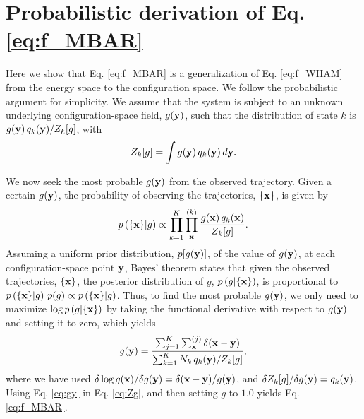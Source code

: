 \documentclass[reprint,aip,jcp,superscriptaddress]{revtex4-1}
\begin{document}
\appendix





\section{\label{sec:deriveMBAR}
Probabilistic derivation of Eq. \eqref{eq:f_MBAR}}



Here we show that
Eq. \eqref{eq:f_MBAR}
is a generalization of Eq. \eqref{eq:f_WHAM}
from the energy space to the configuration space.
%
We follow the probabilistic argument\cite{
bartels1997, *gallicchio2005, *habeck2007, *habeck2012, zhu2012}
for simplicity.
%
We assume that the system is subject to
an unknown underlying configuration-space field, $g(\mathbf{y})$,
such that the distribution of state $k$ is
$g(\mathbf{y}) \, q_k(\mathbf{y}) / Z_k[g]$, with
%
\begin{equation}
Z_k[g]
=
\int g(\mathbf{y}) \, q_k(\mathbf{y}) \, d\mathbf{y}.
\label{eq:Zg}
\end{equation}



We now seek the most probable $g(\mathbf{y})$
from the observed trajectory.
%
Given a certain $g(\mathbf{y})$,
the probability of observing the trajectories,
$\{ \mathbf{x} \}$,
is given by
%
\begin{equation*}
p\left( \{ \mathbf{x} \} | g \right)
\propto
\prod_{k = 1}^K
\prod_{\mathbf{x}}^{(k)}
\frac{ g(\mathbf{x}) \, q_k(\mathbf{x}) }
     { Z_k[g] }.
\end{equation*}
%
Assuming a uniform prior distribution,
$p[g(\mathbf{y})]$, of the value of $g(\mathbf{y})$,
at each configuration-space point $\mathbf{y}$,
Bayes' theorem\cite{leonard} states that
given the observed trajectories, $\{\mathbf{x}\}$,
the posterior distribution of $g$,
$p\left( g | \{ \mathbf{x} \} \right)$,
is proportional to
$p\left( \{ \mathbf{x} \} | g \right) \, p(g) \propto p\left( \{ \mathbf{x} \} | g \right)$.
%
Thus,
to find the most probable $g(\mathbf{y})$,
we only need to maximize
$\log p\left( g | \{ \mathbf{x} \} \right)$
by taking the functional derivative
with respect to $g(\mathbf{y})$
and setting it to zero,
which yields
%
\begin{equation}
g(\mathbf{y})
=
\frac{
  \sum_{j = 1}^K \sum_{\mathbf{x}}^{(j)} \delta(\mathbf{x} - \mathbf{y})
}
{
  \sum_{k = 1}^K N_k \, q_k(\mathbf{y}) / Z_k[g]
},
\label{eq:gy}
\end{equation}
%
where we have used
$\delta \log g(\mathbf{x}) / \delta g(\mathbf{y}) = \delta(\mathbf{x} - \mathbf{y})/g(\mathbf{y})$,
and
$\delta Z_k[g] / \delta g(\mathbf{y}) = q_k(\mathbf{y})$.
%
Using Eq. \eqref{eq:gy}
in Eq. \eqref{eq:Zg},
and then setting $g$ to $1.0$
yields Eq. \eqref{eq:f_MBAR}.
\end{document}
